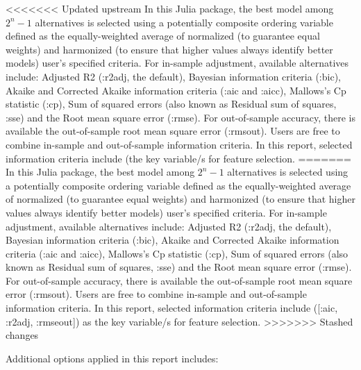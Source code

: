 \documentclass{article}
\begin{document}
<<<<<<< Updated upstream
In this Julia package, the best model among $2^{n}-1$ alternatives is selected using a potentially composite ordering variable defined as the equally-weighted average of normalized (to guarantee equal weights) and harmonized (to ensure that higher values always identify better models) user's specified criteria. For in-sample adjustment, available alternatives include: Adjusted R2 (:r2adj, the default), Bayesian information criteria (:bic), Akaike and Corrected Akaike information criteria (:aic and :aicc), Mallows's Cp statistic (:cp), Sum of squared errors (also known as Residual sum of squares, :sse) and the Root mean square error (:rmse). For out-of-sample accuracy, there is available the out-of-sample root mean square error (:rmsout). Users are free to combine in-sample and out-of-sample information criteria. In this report, selected information criteria include (the key variable/s for feature selection.
=======
In this Julia package, the best model among $2^{n}-1$ alternatives is selected using a potentially composite ordering variable defined as the equally-weighted average of normalized (to guarantee equal weights) and harmonized (to ensure that higher values always identify better models) user's specified criteria. For in-sample adjustment, available alternatives include: Adjusted R2 (:r2adj, the default), Bayesian information criteria (:bic), Akaike and Corrected Akaike information criteria (:aic and :aicc), Mallows's Cp statistic (:cp), Sum of squared errors (also known as Residual sum of squares, :sse) and the Root mean square error (:rmse). For out-of-sample accuracy, there is available the out-of-sample root mean square error (:rmsout). Users are free to combine in-sample and out-of-sample information criteria. In this report, selected information criteria include ([:aic, :r2adj, :rmseout]) as the key variable/s for feature selection.
>>>>>>> Stashed changes

Additional options applied in this report includes:
\end{document}
